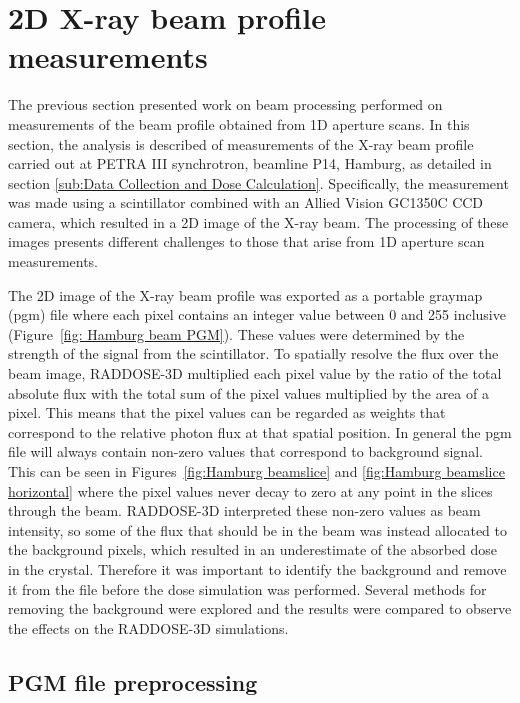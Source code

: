 \section{2D X-ray beam profile measurements}
\label{sec:2D X-ray beam profile measurements}
The previous section presented work on beam processing performed on measurements of the beam profile obtained from 1D aperture scans.
In this section, the analysis is described of measurements of the X-ray beam profile carried out at PETRA III synchrotron, beamline P14, Hamburg, as detailed in section \ref{sub:Data Collection and Dose Calculation}.
Specifically, the measurement was made using a scintillator combined with an Allied Vision GC1350C CCD camera, which resulted in a 2D image of the X-ray beam.
The processing of these images presents different challenges to those that arise from 1D aperture scan measurements.

The 2D image of the X-ray beam profile was exported as a portable graymap (pgm) file where each pixel contains an integer value between 0 and 255 inclusive (Figure~\ref{fig: Hamburg beam PGM}).
These values were determined by the strength of the signal from the scintillator.
To spatially resolve the flux over the beam image, RADDOSE-3D multiplied each pixel value by the ratio of the total absolute flux with the total sum of the pixel values multiplied by the area of a pixel.
This means that the pixel values can be regarded as weights that correspond to the relative photon flux at that spatial position.
In general the pgm file will always contain non-zero values that correspond to background signal.
This can be seen in Figures~\ref{fig:Hamburg beamslice} and \ref{fig:Hamburg beamslice horizontal} where the pixel values never decay to zero at any point in the slices through the beam.
RADDOSE-3D interpreted these non-zero values as beam intensity, so some of the flux that should be in the beam was instead allocated to the background pixels, which resulted in an underestimate of the absorbed dose in the crystal.
Therefore it was important to identify the background and remove it from the file before the dose simulation was performed.
Several methods for removing the background were explored and the results were compared to observe the effects on the RADDOSE-3D simulations.

\subsection{PGM file preprocessing}
\label{sub:PGM file preprocessing}

